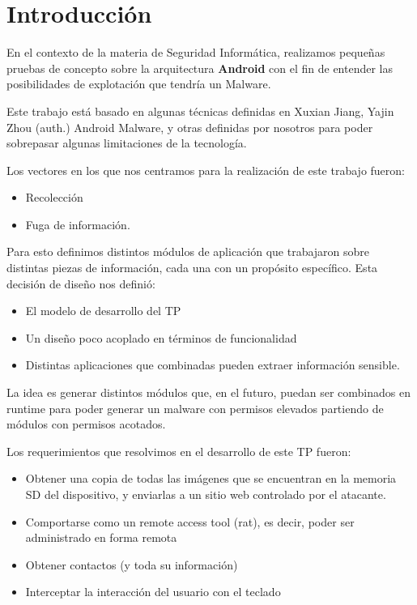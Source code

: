 \section{Introducci\'on}
En el contexto de la materia de Seguridad Inform\'atica, realizamos peque\~nas pruebas de concepto sobre la arquitectura \textbf{Android} con el fin de entender las posibilidades de explotaci\'on que tendr\'ia un Malware.

Este trabajo est\'a basado en algunas t\'ecnicas definidas en Xuxian Jiang,  Yajin Zhou  (auth.) Android Malware, y otras definidas por nosotros para poder sobrepasar algunas limitaciones de la tecnolog\'ia.

Los vectores en los que nos centramos para la realizaci\'on de este trabajo fueron:

\begin{itemize}
    \item Recolecci\'on 
    \item Fuga de informaci\'on.
\end{itemize}


Para esto definimos distintos módulos de aplicaci\'on que trabajaron sobre distintas piezas de informaci\'on, cada una con un prop\'osito espec\'ifico. Esta decisi\'on de dise\~no nos defini\'o:

\begin{itemize}
    \item El modelo de desarrollo del TP
    \item Un dise\~no poco acoplado en términos de funcionalidad
    \item Distintas aplicaciones que combinadas pueden extraer informaci\'on sensible.
\end{itemize}


La idea es generar distintos módulos que, en el futuro, puedan ser combinados en runtime para poder generar un malware con permisos elevados partiendo de módulos con permisos acotados.


Los requerimientos que resolvimos en el desarrollo de este TP fueron:
\begin{itemize}
    \item Obtener una copia de todas las im\'agenes que se encuentran en la memoria SD del dispositivo, y enviarlas a un sitio web controlado por el atacante.
    \item  Comportarse como un remote access tool (rat), es decir, poder ser administrado en forma remota
    \item  Obtener contactos (y toda su información)
    \item  Interceptar la interacci\'on del usuario con el teclado
\end{itemize}
